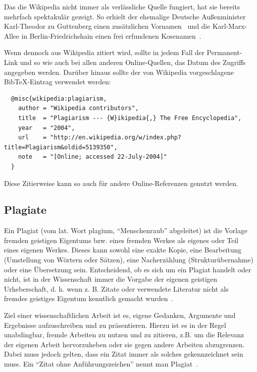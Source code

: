 Das die Wikipedia nicht immer als verlässliche Quelle fungiert, hat sie bereits mehrfach spektakulär gezeigt. So erhielt der ehemalige Deutsche Außenminister Karl-Theodor zu Guttenberg einen zusätzlichen Vornamen~\cite{bildblog:guttenberg, spiegel:guttenberg} und die Karl-Marx-Allee in Berlin-Friedrichshain einen frei erfundenen Kosenamen~\cite{rundschau:wikipedia}.

Wenn dennoch aus Wikipedia zitiert wird, sollte in jedem Fall der Permanent-Link und so wie auch bei allen anderen Online-Quellen, das Datum des Zugriffs angegeben werden. Darüber hinaus sollte der von Wikipedia vorgeschlagene BibTeX-Eintrag verwendet werden:

\begin{lstlisting}
  @misc{wikipedia:plagiarism,
    author = "Wikipedia contributors",
    title  = "Plagiarism --- {W}ikipedia{,} The Free Encyclopedia",
    year   = "2004",
    url    = "http://en.wikipedia.org/w/index.php?title=Plagiarism&oldid=5139350",
    note   = "[Online; accessed 22-July-2004]"
  }
\end{lstlisting}
\smallskip

Diese Zitierweise kann so auch für andere Online-Referenzen genutzt werden.

\subsection{Plagiate}\label{sec:citations:plagiarism}
%
Ein Plagiat (vom lat. Wort plagium, \enquote{Menschenraub} abgeleitet) ist die Vorlage fremden geistigen Eigentums bzw. eines fremden Werkes als eigenes oder Teil eines eigenen Werkes. Dieses kann sowohl eine exakte Kopie, eine Bearbeitung (Umstellung von Wörtern oder Sätzen), eine Nacherzählung (Strukturübernahme) oder eine Übersetzung sein. Entscheidend, ob es sich um ein Plagiat handelt oder nicht, ist in der Wissenschaft immer die Vorgabe der eigenen geistigen Urheberschaft, d. h. wenn z. B. Zitate oder verwendete Literatur nicht als fremdes geistiges Eigentum kenntlich gemacht wurden~\cite{wikipedia:plagiarism, wulff:2013:01}.

Ziel einer wissenschaftlichen Arbeit ist es, eigene Gedanken, Argumente und Ergebnisse aufzuschreiben und zu präsentieren. Hierzu ist es in der Regel unabdingbar, fremde Arbeiten zu nutzen und zu zitieren, z.B. um die Relevanz der eigenen Arbeit hervorzuheben oder sie gegen andere Arbeiten abzugrenzen. Dabei muss jedoch gelten, dass ein Zitat immer als solches gekennzeichnet sein muss. Ein \enquote{Zitat ohne Anführungszeichen} nennt man Plagiat~\cite{eco:2010:01}.

